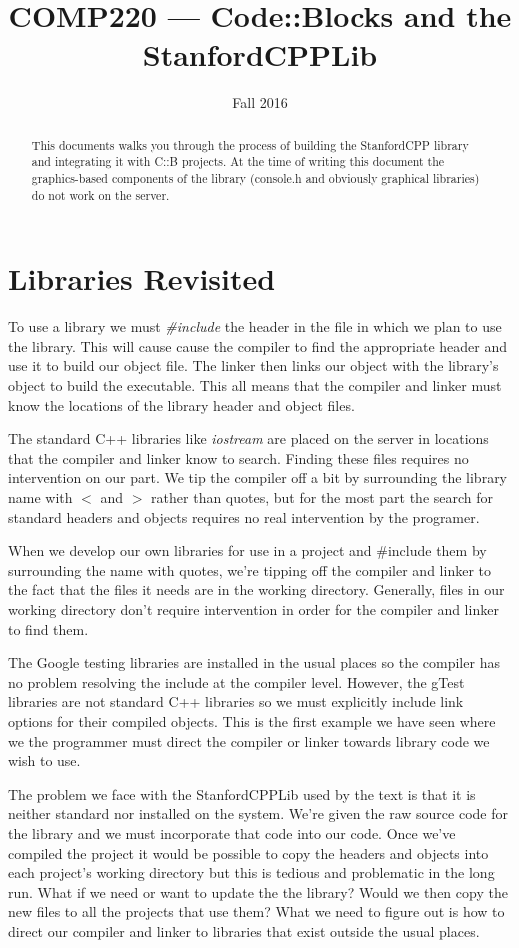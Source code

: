 \documentclass[10pt]{article}
\title{COMP220 --- Code::Blocks and the StanfordCPPLib}
\author{ }
\date{Fall 2016}
\begin{document}
\maketitle

\begin{abstract}
This documents walks you through the process of building the StanfordCPP library and integrating it with C::B projects. At the time of writing this document the graphics-based components of the library (console.h and obviously graphical libraries) do not work on the server.
\end{abstract}

\section{ Libraries Revisited }

To use a library we must \textit{\#include} the header in the file in which we plan to use the library. This will cause cause the compiler to find the appropriate header and use it to build our object file. The linker then links our object with the library's object to build the executable. This all means that the compiler and linker must know the locations of the library header and object files.

The standard C++ libraries like \textit{iostream} are placed on the server in locations that the compiler and linker know to search. Finding these files requires no intervention on our part. We tip the compiler off a bit by surrounding the library name with $<$ and $>$ rather than quotes, but for the most part the search for standard headers and objects requires no real intervention by the programer.

When we develop our own libraries for use in a project and \#include them by surrounding the name with quotes, we're tipping off the compiler and linker to the fact that the files it needs are in the working directory.  Generally, files in our working directory don't require intervention in order for the compiler and linker to find them.

The Google testing libraries are installed in the usual places so the compiler has no problem resolving the include at the compiler level. However, the gTest libraries are not standard C++ libraries so we must explicitly include link options for their compiled objects. This is the first example we have seen where we the programmer must direct the compiler or linker towards library code we wish to use.


The problem we face with the StanfordCPPLib used by the text is that it is neither standard nor installed on the system. We're given the raw source code for the library and we must incorporate that code into our code. Once we've compiled the project it would be possible to copy the headers and objects into each project's working directory but this is tedious and problematic in the long run. What if we need or want to update the the library? Would we then copy the new files to all the projects that use them? What we need to figure out is how to direct our compiler and linker to libraries that exist outside the usual places.
\end{document}
